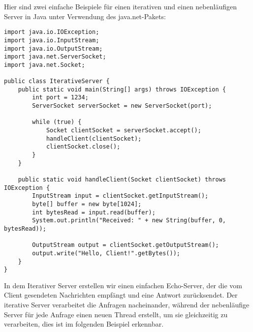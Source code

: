Hier sind zwei einfache Beispiele für einen iterativen und einen nebenläufigen Server in Java unter Verwendung des java.net-Pakets:

\begin{lstlisting}[caption={Iterativer Server},captionpos=b,label={lst:iterativ}]
import java.io.IOException;
import java.io.InputStream;
import java.io.OutputStream;
import java.net.ServerSocket;
import java.net.Socket;

public class IterativeServer {
    public static void main(String[] args) throws IOException {
        int port = 1234;
        ServerSocket serverSocket = new ServerSocket(port);

        while (true) {
            Socket clientSocket = serverSocket.accept();
            handleClient(clientSocket);
            clientSocket.close();
        }
    }

    public static void handleClient(Socket clientSocket) throws IOException {
        InputStream input = clientSocket.getInputStream();
        byte[] buffer = new byte[1024];
        int bytesRead = input.read(buffer);
        System.out.println("Received: " + new String(buffer, 0, bytesRead));

        OutputStream output = clientSocket.getOutputStream();
        output.write("Hello, Client!".getBytes());
    }
}
\end{lstlisting}

In dem Iterativer Server erstellen wir einen einfachen Echo-Server, der die vom Client gesendeten Nachrichten empfängt und eine Antwort zurücksendet. Der iterative Server verarbeitet die Anfragen nacheinander, während der nebenläufige Server für jede Anfrage einen neuen Thread erstellt, um sie gleichzeitig zu verarbeiten, dies ist im folgenden Beispiel erkennbar.

